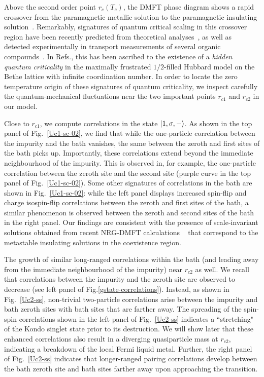 Above the second order point \(r_c(T_c)\), the DMFT phase diagram shows a rapid crossover from the paramagnetic metallic solution to the paramagnetic insulating solution~\cite{georges1996,limelette_2003}. Remarkably, signatures of quantum critical scaling in this crossover region have been recently predicted from theoretical analyses~\cite{terletska_mott_2011,vucicevic_2013}, as well as detected experimentally in transport measurements of several organic compounds~\cite{Kagawa2005,Furukawa2015}. In Refs.\cite{terletska_mott_2011,vucicevic_2013}, this has been ascribed to the existence of a \textit{hidden quantum criticality} in the maximally frustrated $1/2$-filled Hubbard model on the Bethe lattice with infinite coordination number. In order to locate the zero temperature origin of these signatures of quantum criticality, we inspect carefully the quantum-mechanical fluctuations near the two important points \(r_{c1}\) and \(r_{c2}\) in our model.

Close to \(r_{c1}\), we compute correlations in the state \(\ket{1,\sigma,-}\).
As shown in the top panel of Fig.~\eqref{Uc1-sc-02}, we find that while the one-particle correlation between the impurity and the bath vanishes, the same between the zeroth and first sites of the bath picks up. Importantly, these correlations extend beyond the immediate neighbourhood of the impurity. This is observed in, for example, the one-particle correlation between the zeroth site and the second site (purple curve in the top panel of Fig.~\eqref{Uc1-sc-02}). Some other signatures of correlations in the bath are shown in Fig.~\eqref{Uc1-sc-02}: while the left panel displays increased spin-flip and charge isospin-flip correlations between the zeroth and first sites of the bath, a similar phenomenon is observed between the zeroth and second sites of the bath in the right panel. 
Our findings are consistent with the presence of scale-invariant solutions obtained from recent NRG-DMFT calculations ~\cite{Eisenlohr_2019} that correspond to the metastable insulating solutions in the coexistence region.

The growth of similar long-ranged correlations within the bath (and leading away from the immediate neighbourhood of the impurity) 
near \(r_{c2}\) as well.
We recall that correlations between the impurity and the zeroth site are observed to decrease (see left panel of Fig.\eqref{gstate-correlations}).
Instead, as shown in Fig.~\eqref{Uc2-ss}, non-trivial two-particle correlations arise between the impurity and bath zeroth sites with bath sites that are farther away.
The spreading of the spin-spin correlations shown in the left panel of Fig.~\eqref{Uc2-ss} indicates a ``stretching" of the Kondo singlet state prior to its destruction. We will show later that these enhanced correlations also result in a diverging quasiparticle mass at \(r_{c2}\), indicating a breakdown of the local Fermi liquid metal. Further, the right panel of Fig.~\eqref{Uc2-ss} indicates that longer-ranged pairing correlations develop between the bath zeroth site and bath sites farther away upon approaching the transition.

